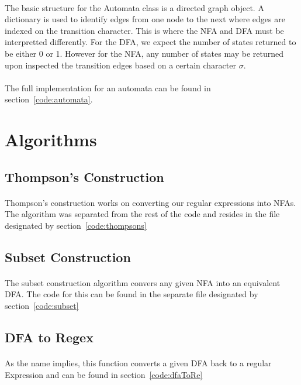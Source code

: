 \documentclass{article}
\begin{document}
\paragraph{} The basic structure for the Automata class is a directed
graph object. A dictionary is used to identify edges from one node to the 
next where edges are indexed on the transition character. This is where the
NFA and DFA must be interpretted differently. For the DFA, we expect the 
number of states returned to be either 0 or 1. However for the NFA, any number
of states may be returned upon inspected the transition edges based on a certain
character $\sigma$.

\paragraph{} The full implementation for an automata can be found in section~\ref{code:automata}.

\section{Algorithms}
\subsection{Thompson's Construction}
\paragraph{}Thompson's construction works on converting our regular expressions into NFAs. The algorithm was separated from the rest of the code and resides in the file designated by section~\ref{code:thompsons}

\subsection{Subset Construction}
\paragraph{}The subset construction algorithm convers any given NFA into an equivalent DFA. The code for this can be found in the separate file designated by section~\ref{code:subset}

\subsection{DFA to Regex}
\paragraph{}As the name implies, this function converts a given DFA back to a regular Expression and can be found in section~\ref{code:dfaToRe}
\end{document}
